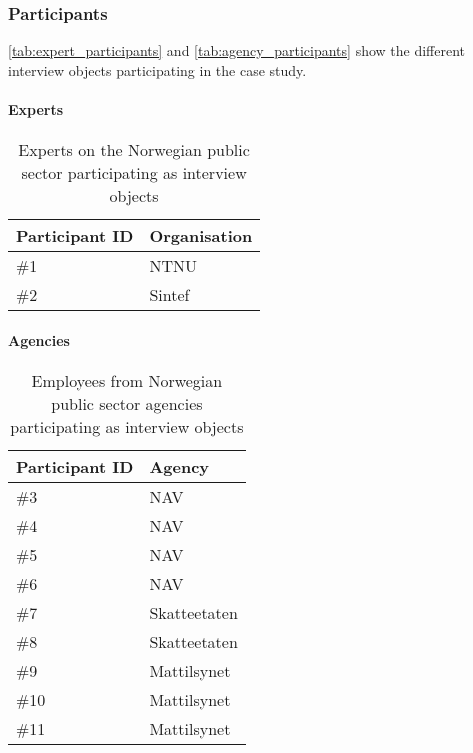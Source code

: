 \subsubsection{Participants}
\autoref{tab:expert_participants} and \autoref{tab:agency_participants} show the different interview objects participating in the case study.

\paragraph{Experts} \hspace{0cm}
\begin{table}[H]
\centering
\begin{tabular}{|l|l|}
\hline
\textbf{Participant ID} & \textbf{Organisation} \\ \hline
\#1 & NTNU  \\ \hline
\#2 & Sintef \\ \hline
\end{tabular}
\caption{Experts on the Norwegian public sector participating as interview objects}
\label{tab:expert_participants}
\end{table}

\paragraph{Agencies} \hspace{0cm}
\begin{table}[H]
\centering
\begin{tabular}{|l|l|}
\hline
\textbf{Participant ID} & \textbf{Agency} \\ \hline
\#3 & NAV  \\ \hline
\#4 & NAV  \\ \hline
\#5 & NAV  \\ \hline
\#6 & NAV  \\ \hline
\#7 & Skatteetaten  \\ \hline
\#8 & Skatteetaten  \\ \hline
\#9 & Mattilsynet  \\ \hline
\#10 & Mattilsynet  \\ \hline
\#11 & Mattilsynet  \\ \hline
\end{tabular}
\caption{Employees from Norwegian public sector agencies participating as interview objects}
\label{tab:agency_participants}
\end{table}

